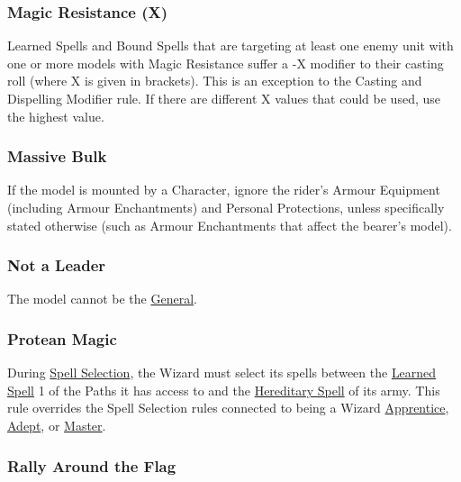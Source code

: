 
\subsubsection{Magic Resistance (X)}
\label{magic_resistance}

Learned Spells and Bound Spells that are targeting at least one enemy unit with one or more models with Magic Resistance suffer a -X modifier to their casting roll (where X is given in brackets). This is an exception to the Casting and Dispelling Modifier rule. If there are different X values that could be used, use the highest value.

\subsubsection{Massive Bulk}
\label{massive_bulk}

If the model is mounted by a Character, ignore the rider's Armour Equipment (including Armour Enchantments) and Personal Protections, unless specifically stated otherwise (such as Armour Enchantments that affect the bearer's model). 

\subsubsection{Not a Leader}
\label{not_a_leader}

The model cannot be the \hyperref[the_general]{General}.

\subsubsection{Protean Magic}
\label{protean_magic}

During \hyperref[spell_selection]{Spell Selection}, the Wizard must select its spells between the \hyperref[learned_spells]{Learned Spell} 1 of the Paths it has access to and the \hyperref[hereditary_spells]{Hereditary Spell} of its army. This rule overrides the Spell Selection rules connected to being a Wizard \hyperref[wizard_apprentice]{Apprentice}, \hyperref[wizard_adept]{Adept}, or \hyperref[wizard_master]{Master}.

\subsubsection{Rally Around the Flag}
\label{rally_around_the_flag}

